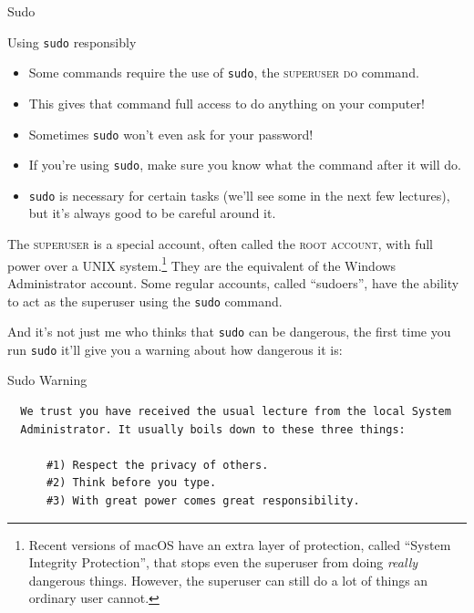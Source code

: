 \begin{frame}{Sudo}
  \begin{alertblock}{Using \texttt{sudo} responsibly}
    \begin{itemize}
      \item
        Some commands require the use of \texttt{sudo}, the \textsc{superuser
        do} command.
      \pause
      \item
        This gives that command full access to do anything on your computer!
      \pause
      \item
        Sometimes \texttt{sudo} won't even ask for your password!
      \pause
      \item
        If you're using \texttt{sudo}, make sure you know what the command
        after it will do.
      \pause
      \item
        \texttt{sudo} is necessary for certain tasks (we'll see some in the
        next few lectures), but it's always good to be careful around it.
    \end{itemize}
  \end{alertblock}
\end{frame}

\begin{definition}[superuser]
  The \textsc{superuser} is a special account, often called the \textsc{root
  account}, with full power over a UNIX system.\footnote{
    Recent versions of macOS have an extra layer of protection, called
    \enquote{System Integrity Protection}, that stops even the superuser from
    doing \textit{really} dangerous things.  However, the superuser can still
    do a lot of things an ordinary user cannot.
  }  They are the equivalent of the Windows Administrator account.  Some
  regular accounts, called \enquote{sudoers}, have the ability to act as the
  superuser using the \texttt{sudo} command.
\end{definition}

And it's not just me who thinks that \texttt{sudo} can be dangerous, the first
time you run \texttt{sudo} it'll give you a warning about how dangerous it is:

\begin{frame}[fragile]{Sudo Warning}
  \begin{verbatim}
  We trust you have received the usual lecture from the local System
  Administrator. It usually boils down to these three things:

      #1) Respect the privacy of others.
      #2) Think before you type.
      #3) With great power comes great responsibility.
  \end{verbatim}
\end{frame}

